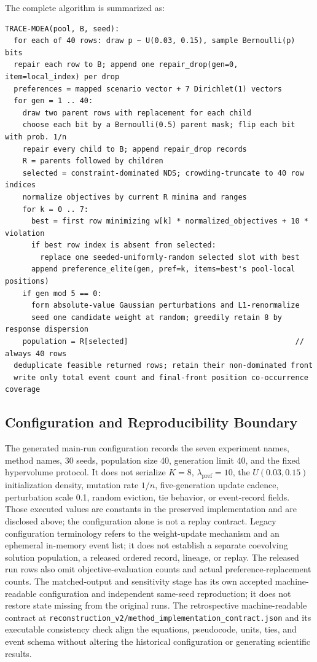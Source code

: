 \documentclass[energies,article,submit,moreauthors]{Definitions/mdpi}
\begin{document}
The complete algorithm is summarized as:

\begin{verbatim}
TRACE-MOEA(pool, B, seed):
  for each of 40 rows: draw p ~ U(0.03, 0.15), sample Bernoulli(p) bits
  repair each row to B; append one repair_drop(gen=0, item=local_index) per drop
  preferences = mapped scenario vector + 7 Dirichlet(1) vectors
  for gen = 1 .. 40:
    draw two parent rows with replacement for each child
    choose each bit by a Bernoulli(0.5) parent mask; flip each bit with prob. 1/n
    repair every child to B; append repair_drop records
    R = parents followed by children
    selected = constraint-dominated NDS; crowding-truncate to 40 row indices
    normalize objectives by current R minima and ranges
    for k = 0 .. 7:
      best = first row minimizing w[k] * normalized_objectives + 10 * violation
      if best row index is absent from selected:
        replace one seeded-uniformly-random selected slot with best
      append preference_elite(gen, pref=k, items=best's pool-local positions)
    if gen mod 5 == 0:
      form absolute-value Gaussian perturbations and L1-renormalize
      seed one candidate weight at random; greedily retain 8 by response dispersion
    population = R[selected]                                      // always 40 rows
  deduplicate feasible returned rows; retain their non-dominated front
  write only total event count and final-front position co-occurrence coverage
\end{verbatim}

\subsection{Configuration and Reproducibility Boundary}\label{configuration-and-reproducibility-boundary}

The generated main-run configuration records the seven experiment names, method names, 30 seeds, population size 40, generation limit 40, and the fixed hypervolume protocol. It does not serialize \(K=8\), \(\lambda_{\mathrm{pref}}=10\), the \(U(0.03,0.15)\) initialization density, mutation rate \(1/n\), five-generation update cadence, perturbation scale 0.1, random eviction, tie behavior, or event-record fields. Those executed values are constants in the preserved implementation and are disclosed above; the configuration alone is not a replay contract. Legacy configuration terminology refers to the weight-update mechanism and an ephemeral in-memory event list; it does not establish a separate coevolving solution population, a released ordered record, lineage, or replay. The released run rows also omit objective-evaluation counts and actual preference-replacement counts. The matched-output and sensitivity stage has its own accepted machine-readable configuration and independent same-seed reproduction; it does not restore state missing from the original runs. The retrospective machine-readable contract at \texttt{reconstruction\_v2/method\_implementation\_contract.json} and its executable consistency check align the equations, pseudocode, units, ties, and event schema without altering the historical configuration or generating scientific results.
\end{document}
